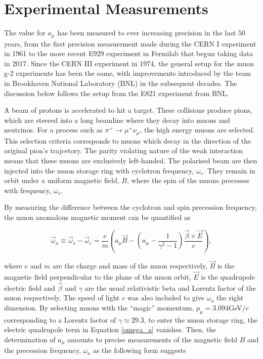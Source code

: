 \documentclass{article}
\numberwithin{equation}{section} %
\begin{document}
\section{Experimental Measurements}\label{exp}
The value for $a_\mu$ has been measured to ever increasing precision in the last 50 years, from the first precision measurement made during the CERN I experiment in 1961\cite{fermilab} to the more recent E929 experiment in Fermilab that begun taking data in 2017. Since the CERN III experiment in 1974, the general setup for the muon g-2 experiments has been the same, with improvements introduced by the team in Brookhaven National Laboratory (BNL) in the subsequent decades. The discussion below follows the setup from the E821 experiment from BNL\cite{bnl}.

A beam of protons is accelerated to hit a target. These collisions produce pions, which are steered into a long beamline where they decay into muons and neutrinos. For a process such as $\pi^+ \rightarrow \mu^+\nu_\mu$, the high energy muons are selected. This selection criteria corresponds to muons which decay in the direction of the original pion's trajcetory. The parity violating nature of the weak interaction means that these muons are exclusively left-handed\cite{sm}. The polarised beam are then injected into the muon storage ring with cyclotron frequency, $\omega_c$. They remain in orbit under a uniform magnetic field, $B$, where the spin of the muons precesses with frequency, $\omega_s$.

By measuring the difference between the cyclotron and spin precession frequency, the muon anomalous magnetic moment can be quantified as

\begin{equation}
\vec{\omega}_a \equiv \vec{\omega}_s-\vec{\omega}_c = \frac{e}{m}\left( a_\mu \vec{B}-(a_\mu-\frac{1}{\gamma^2-1})\frac{\vec{\beta}\times\vec{E}}{c}\right),
\label{omega_a}
\end{equation} 

\noindent where $e$ and $m$ are the charge and mass of the muon respectively, $\vec{B}$ is the magnetic field perpendicular to the plane of the muon orbit, $\vec{E}$ is the quadrupole electric field and $\vec{\beta}$ and $\gamma$ are the usual relativistic beta and Lorentz factor of the muon respectively. The speed of light $c$ was also included to give $\omega_a$ the right dimension. By selecting muons with the ``magic'' momentum, $p_\mu=3.094$GeV/c corresponding to a Lorentz factor of $\gamma\approx 29.3$, to enter the muon storage ring, the electric quadrupole term in Equation \ref{omega_a} vanishes. Then, the determination of $a_\mu$ amounts to precise measurements of the magnetic field $B$ and the precession frequency, $\omega_a$ as the following form suggests
\end{document}
